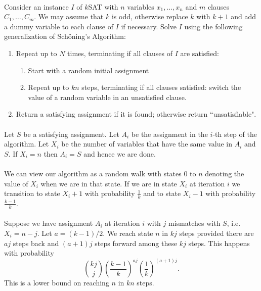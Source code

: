 \documentclass[letterpaper,12pt,oneside,onecolumn]{article}
\begin{document}
\paragraph{}
Consider an instance $I$ of $k$SAT with $n$ variables $x_1,\dots,x_n$ and $m$ clauses $C_1, \dots, C_m$. We may assume that $k$ is odd, otherwise replace $k$ with $k+1$ and add a dummy variable to each clause of $I$ if necessary. Solve $I$ using the following generalization of Sch\"oning's Algorithm:
\begin{enumerate}
	\item Repeat up to $N$ times, terminating if all clauses of $I$ are satisfied:
	\begin{enumerate}
		\item Start with a random initial assignment
		\item Repeat up to $kn$ steps, terminating if all clauses satisfied: switch the value of a random variable in an unsatisfied clause.
	\end{enumerate}
	\item Return a satisfying assignment if it is found; otherwise return ``unsatisfiable".
\end{enumerate}
\paragraph{}
Let $S$ be a satisfying assignment. Let $A_i$ be the assignment in the $i$-th step of the algorithm. Let $X_i$ be the number of variables that have the same value in $A_i$ and $S$. If $X_i = n$ then $A_i = S$ and hence we are done.
\paragraph{}
We can view our algorithm as a random walk with states $0$ to $n$ denoting the value of $X_i$ when we are in that state. If we are in state $X_i$ at iteration $i$ we transition to state $X_i+1$ with probability $\frac{1}{k}$ and to state $X_i-1$ with probability $\frac{k-1}{k}$.
\paragraph{}
Suppose we have assignment $A_i$ at iteration $i$ with $j$ mismatches with $S$, i.e. $X_i = n-j$. Let $a = (k-1)/2$. We reach state $n$ in $kj$ steps provided there are $aj$ steps back and $(a+1)j$ steps forward among these $kj$ steps. This happens with probability
$${kj\choose j}(\frac{k-1}{k})^{aj}(\frac{1}{k})^{(a+1)j}.$$
This is a lower bound on reaching $n$ in $kn$ steps.
\end{document}
